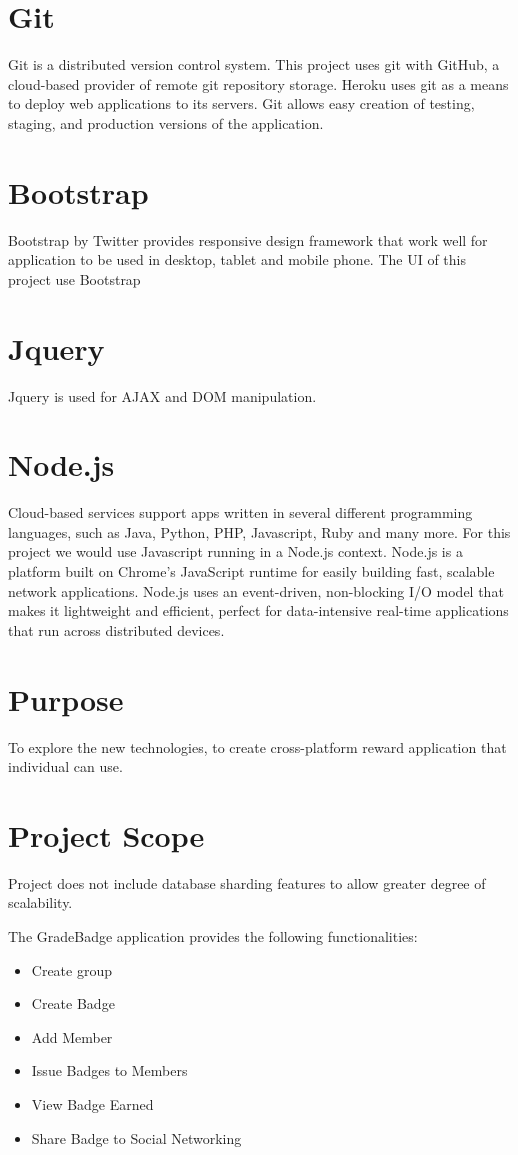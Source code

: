 \section{Git}
Git is a distributed version control system.  This project uses git with GitHub, a cloud-based provider of remote git repository storage.  Heroku uses git as a means to deploy web applications to its servers. Git allows easy creation of testing, staging, and production versions of the application. 

\section{Bootstrap}
Bootstrap by Twitter provides responsive design framework that work well for application to be used in desktop, tablet and mobile phone. The UI of this project use Bootstrap  

\section{Jquery}
Jquery is used for AJAX and DOM manipulation.

\section{Node.js}
Cloud-based services support apps written in several different programming languages, such as Java, Python, PHP, Javascript, Ruby and many more. For this project we would use Javascript running in a Node.js context. Node.js is a platform built on Chrome's JavaScript runtime for easily building fast, scalable network applications. Node.js uses an event-driven, non-blocking I/O model that makes it lightweight and efficient, perfect for data-intensive real-time applications that run across distributed devices.

\section{Purpose}
To explore the new technologies, to create cross-platform reward application that individual can use.

\section{Project Scope}
Project does not include database sharding features to allow greater degree of scalability. 

The GradeBadge application provides the following functionalities:
\begin{itemize}
\item Create group
\item Create Badge 
\item Add Member
\item Issue Badges to Members
\item View Badge Earned
\item Share Badge to Social Networking 
\end{itemize}

